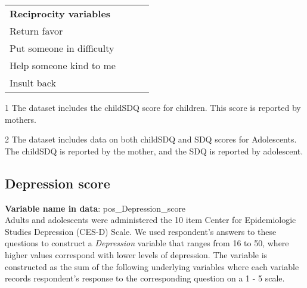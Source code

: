\begin{table}[H]
\begin{center}
{\begin{threeparttable}
\begin{tabular}{L{5.5cm}C{2cm} C{2cm} C{2cm}}
		\textbf{Reciprocity variables}							&									&							&								\\
		\quad \quad Return favor								&									& \checkmark				& \checkmark					 \\
		\quad \quad Put someone in difficulty					&									& \checkmark				& \checkmark					 \\	
		\quad \quad Help someone kind to me					&									& \checkmark				& \checkmark					 \\
		\quad \quad Insult back								&									& \checkmark				& \checkmark					 \\

		
		\hline
		\end{tabular}

		\begin{tablenotes}
		\singlespace
		\footnotesize{
			\item [1] The dataset includes the childSDQ score for children. This score is reported by mothers. \\
			\item [2] The dataset includes data on both childSDQ and SDQ scores for Adolescents. The childSDQ is reported by the mother, and the SDQ is reported by adolescent.	
		}
		\end{tablenotes}
	\end{threeparttable}
	}
	\end{center}
\end{table}
\setcounter{footnote}{0}

 \clearpage

\subsection{Depression score}
\textbf{Variable name in data}: pos\_Depression\_score \\[.3cm]
Adults and adolescents were administered the 10 item Center for Epidemiologic Studies Depression (CES-D) Scale. We used respondent's answers to these questions to construct a \textit{Depression} variable that ranges from 16 to 50, where higher values correspond with lower levels of depression. The variable is constructed as the sum of the following underlying variables where each variable records respondent's response to the corresponding question on a 1 - 5 scale. \\

